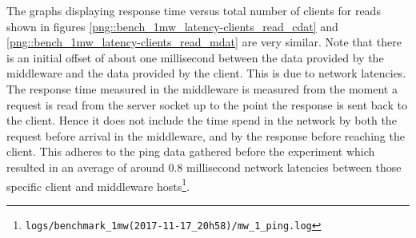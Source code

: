 \documentclass[11pt,a4paper]{article}
\begin{document}
The graphs displaying response time versus total number of clients for reads shown in figures \ref{png::bench_1mw_latency-clients_read_cdat} and \ref{png::bench_1mw_latency-clients_read_mdat} are very similar. Note that there is an initial offset of about one millisecond between the data provided by the middleware and the data provided by the client. This is due to network latencies. The response time measured in the middleware is measured from the moment a request is read from the server socket up to the point the response is sent back to the client. Hence it does not include the time spend in the network by both the request before arrival in the middleware, and by the response before reaching the client. This adheres to the ping data gathered before the experiment which resulted in an average of around 0.8 millisecond network latencies between those specific client and middleware hosts\footnote{\texttt{logs/benchmark_1mw(2017-11-17_20h58)/mw_1_ping.log}}.
\end{document}
